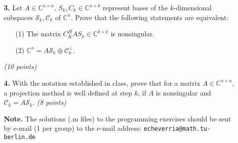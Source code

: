 \documentclass[10pt]{report}
\begin{document}
\begin{enumerate}
\item[\textbf{3.}]  Let $A \in \mathbb{C}^{n \times n}$, $S_k,C_k\in\mathbb{C}^{n\times k}$ represent bases of the $k$-dimensional subspaces $\mathcal{S}_k,\mathcal{C}_k$ of $\mathbb{C}^n$. Prove that the following statements are equivalent: 
\begin{enumerate}
  \item[(1)] The matrix $C_K^HAS_k\in\mathbb{C}^{k\times k}$ is nonsingular.
  \item[(2)] $\mathbb{C}^{n}=A\mathcal{S}_k\oplus\mathcal{C}_k^\perp$. 
\end{enumerate}
\textit{(10 points)} 
\vspace{0.1cm} 

\item[\textbf{4.}] With the notation established in class, prove that for a matrix $A \in \mathbb{C}^{n \times n}$, a projection method is well defined at step $k$, if $A$ is nonsingular and $\mathcal{C}_k=A\mathcal{S}_k$. \textit{(8 points)}


\vspace{2cm} 

\item[\textbf{Note.}] The solutions (.m files) to the programming exercises should be sent by e-mail (1 per group) to the e-mail address: \verb+echeverria@math.tu-berlin.de+ \\


\end{enumerate}
\end{document}
